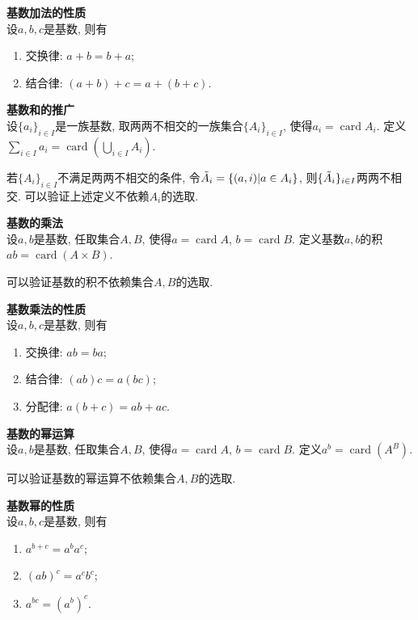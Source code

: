 \begin{pro}\textbf{基数加法的性质}\\
设$a,b,c$是基数, 则有
\begin{enumerate}
\item 交换律: $a+b=b+a$;
\item 结合律: $(a+b)+c = a+(b+c)$.
\end{enumerate}
\end{pro}

\begin{dfn} \textbf{基数和的推广}\\
设$\{a_i\}_{i\in I}$是一族基数, 取两两不相交的一族集合$\{A_i\}_{i\in I}$, 使得$a_i=\operatorname{card} A_i$. 定义$\sum_{i\in I} a_i=\operatorname{card}\left(\bigcup_{i\in I} A_i\right)$. 
\end{dfn}
\par 若$\{A_i\}_{i\in I}$不满足两两不相交的条件, 令$\Tilde{A}_i=\{(a,i)\vert a\in A_i\}$, 则$\{\Tilde{A}_i\}_{i\in I}$两两不相交. 可以验证上述定义不依赖$A_i$的选取. 

\begin{dfn} \textbf{基数的乘法}\\
设$a,b$是基数, 任取集合$A,B$, 使得$a=\operatorname{card}A$, $b=\operatorname{card}B$. 定义基数$a,b$的积$ab=\operatorname{card}(A\times B)$. 
\end{dfn}
可以验证基数的积不依赖集合$A,B$的选取. 

\begin{pro}\textbf{基数乘法的性质}\\
设$a,b,c$是基数, 则有
\begin{enumerate}
\item 交换律: $ab=ba$;
\item 结合律: $(ab)c=a(bc)$;
\item 分配律: $a(b+c)=ab+ac$.
\end{enumerate}
\end{pro}

\begin{dfn} \textbf{基数的幂运算}\\
设$a,b$是基数, 任取集合$A,B$, 使得$a=\operatorname{card}A$, $b=\operatorname{card}B$. 定义$a^b=\operatorname{card}(A^B)$. 
\end{dfn}
可以验证基数的幂运算不依赖集合$A,B$的选取. 

\begin{pro}\textbf{基数幂的性质}\\
设$a,b,c$是基数, 则有
\begin{enumerate}
\item $a^{b+c}=a^ba^c$;
\item $(ab)^c=a^cb^c$;
\item $a^{bc}=(a^b)^c$.
\end{enumerate}
\end{pro}

